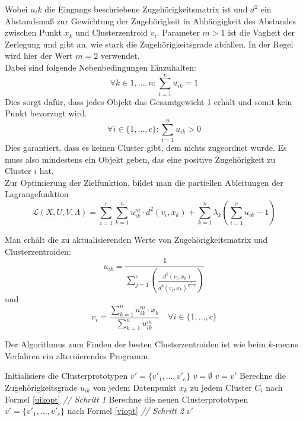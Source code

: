 \documentclass[11pt,ceqn]{book}
\begin{document}
Wobei $u_ik$ die Eingangs beschriebene Zugehörigkeitsmatrix ist und $d^2$ ein Abstandsmaß zur Gewichtung der Zugehörigkeit in Abhängigkeit des Abstandes zwischen Punkt $x_k$ und Clusterzentroid $v_i$. Parameter $m>1$ ist die Vagheit der Zerlegung und gibt an, wie stark die Zugehörigkeitsgrade abfallen. In der Regel wird hier der Wert $m=2$ verwendet.
\\
Dabei sind folgende Nebenbedingungen Einzuhalten:
$$\forall k \in {1, \dots, n} : \sum_{i=1}^c u_{ik} = 1$$
Dies sorgt dafür, dass jedes Objekt das Gesamtgewicht 1 erhält und somit kein Punkt bevorzugt wird.
$$\forall i \in \{1, \dots, c\} : \sum_{i=1}^n u_{ik} > 0$$
Dies garantiert, dass es keinen Cluster gibt, dem nichts zugeordnet wurde. Es muss also mindestens ein Objekt geben, das eine positive Zugehörigkeit zu Cluster $i$ hat.
\\
Zur Optimierung der Zielfunktion, bildet man die partiellen Ableitungen der Lagrangefunktion 
$$\mathcal{L}(X, U, V , \Lambda) = \sum_{i=1}^{c} \sum_{k=1}^{n} u_{ik}^m \cdot d^2(v_i,x_k) + \sum_{k=1}^n \lambda_k \left(\sum_{i=1}^c u_{ik} - 1\right)$$

Man erhält die zu aktualisierenden Werte von Zugehörigkeitsmatrix und Clusterzentroiden:
\begin{equation} \label{uikopt}
u_{ik} = \frac{1}{\sum\limits_{j=1}^c \left(\frac{d^2(v_i, x_k)}{d^2(v_j, x_k)^{\frac{1}{m-1}}}\right)}
\end{equation}
und
\begin{equation} \label{viopt}
v_i = \frac{\sum\limits_{k=1}^n u_{ik}^m \cdot x_k}{\sum\limits_{k=1}^n u_{ik}^m}  \quad \forall i \in \{1, \dots, c\}
\end{equation}


Der Algorithmus zum Finden der besten Clusterzentroiden ist wie beim $k$-means Verfahren ein alternierendes Programm.
\begin{algorithm}[H]
\caption{$FCM(X,c,m,\epsilon)$}\label{fcm}
\begin{algorithmic}[1]
\State Initialisiere die Clusterprototypen $v' = \{v'_1, \dots, v'_c\}$
\State $v = \emptyset$
\Repeat
\State $v=v'$
\State Berechne die Zugehörigkeitsgrade $u_{ik}$ von jedem Datenpunkt $x_k$ zu jedem Cluster $C_i$ nach \hspace*{5mm} Formel \eqref{uikopt} \textit{// Schritt 1}
\State Berechne die neuen Clusterprototypen $v' = \{v'_1, \dots, v'_c\}$ nach Formel \eqref{viopt} \textit{// Schritt 2}
\State \Return $v'$
\end{algorithmic}
\end{algorithm}
\end{document}

